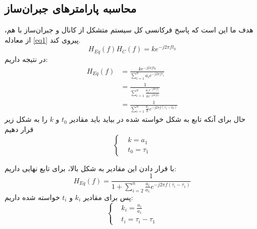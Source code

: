 \documentclass[10pt]{article}
\begin{document}
 \subsection{محاسبه پارامترهای جبران‌ساز}
 هدف ما این است که پاسخ فرکانسی کل سیستم متشکل از کانال و جبران‌ساز با هم، از معادله
  \eqref{eq1}
  پیروی کند.
  \begin{equation}\label{eq1}
  	H_{Eq}(f) H_{C}(f) = ke^{-j2\pi ft_0}
  \end{equation}
در نتیجه داریم:
\begin{equation}
	\begin{split}
		H_{Eq}(f) &= \frac{ke^{-j2\pi ft_0}}{\sum_{i=1}^{n} a_i e^{-j2\pi f \tau_i}} \\
		&= \frac{1}{\sum_{i=1}^{n} \frac{a_i e^{-j2\pi f \tau_i}}{ke^{-j2\pi ft_0}}} \\
		&= \frac{1}{\sum_{i=1}^{n} \frac{a_i}{k} e^{-j2\pi f(\tau_i - t_0)}}
	\end{split}
\end{equation}
حال برای آنکه تابع به شکل خواسته شده در بیاید باید مقادیر
$t_0$
و 
$k$
را به شکل زیر قرار دهیم
\begin{equation}
	\begin{cases}
		&k = a_1\\
		&t_0 = \tau_1 
	\end{cases}
\end{equation}

با قرار دادن این مقادیر به شکل بالا، برای تابع نهایی داریم:
\begin{equation}
	H_{Eq}(f) = \frac{1}{1 + \sum_{i=2}^{n} \frac{a_i}{a_1} e^{-j2\pi f(\tau_i - \tau_1)}}
\end{equation}
پس برای مقادیر 
$k_i$
و
$t_i$
خواسته شده داریم:
 \begin{equation}
 	\begin{cases}
 		&k_i = \frac{a_i}{a_1} \\
 		&t_i = \tau_i - \tau_1 
 	\end{cases}
 \end{equation}
\newpage
\end{document}
